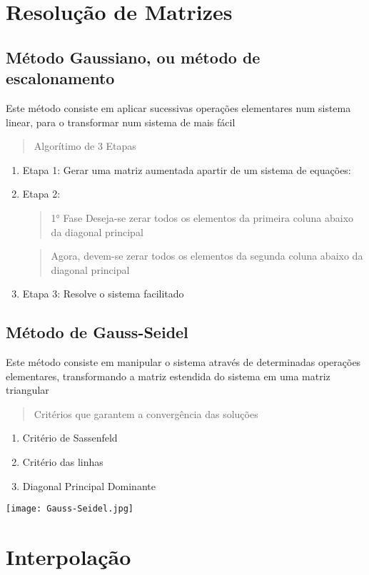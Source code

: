 \documentclass{article}
\begin{document}
\begin{multicols}{2}
\section{Resolução de Matrizes}
        \subsection{Método Gaussiano, ou método de \\escalonamento}
        Este método consiste em aplicar sucessivas operações elementares num sistema linear, para o transformar num sistema de mais fácil
        
        \begin{quote}
            Algorítimo de 3 Etapas
        \end{quote}
        \begin{enumerate}
            \item Etapa 1: Gerar uma matriz aumentada apartir de um sistema de equações:
            \item Etapa 2: 
            \begin{quote}
                1° Fase Deseja-se zerar todos os elementos da primeira coluna abaixo da diagonal principal
            \end{quote}
            \begin{quote}
                Agora, devem-se zerar todos os elementos da segunda coluna abaixo da diagonal principal
            \end{quote}
            \item Etapa 3: Resolve o sistema facilitado
        \end{enumerate}
        
        \subsection{Método de Gauss-Seidel}
        Este método consiste em manipular o sistema através de determinadas operações elementares, transformando a matriz estendida do sistema em uma matriz triangular

        \begin{quote}
            Critérios que garantem a convergência das soluções
        \end{quote}
        \begin{enumerate}
            \item Critério de Sassenfeld
            \item Critério das linhas
            \item Diagonal Principal Dominante
        \end{enumerate}

        \hbox{\texttt{[image: Gauss-Seidel.jpg]}}
    
    \section{Interpolação}
        \subsection{}


\end{multicols}
\end{document}
